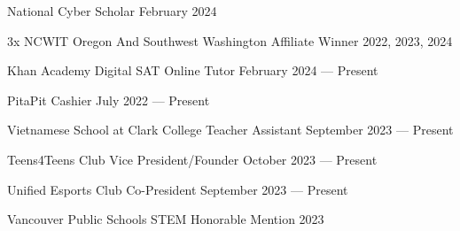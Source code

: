National Cyber Scholar \hfill February 2024

3x NCWIT Oregon And Southwest Washington Affiliate Winner \hfill 2022, 2023, 2024

Khan Academy Digital SAT Online Tutor \hfill February 2024 --- Present

PitaPit Cashier	\hfill July 2022 --- Present
 
Vietnamese School at Clark College Teacher Assistant	\hfill September 2023 --- Present

Teens4Teens Club Vice President/Founder	\hfill October 2023 --- Present

Unified Esports Club Co-President	\hfill September 2023 --- Present

Vancouver Public Schools STEM Honorable Mention	\hfill 2023



